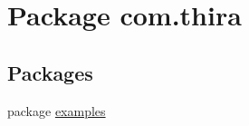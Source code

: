 \hypertarget{namespacecom_1_1thira}{\section{Package com.\-thira}
\label{namespacecom_1_1thira}
}
\subsection*{Packages}
\begin{DoxyCompactItemize}
\item 
package \hyperlink{namespacecom_1_1thira_1_1examples}{examples}
\end{DoxyCompactItemize}
